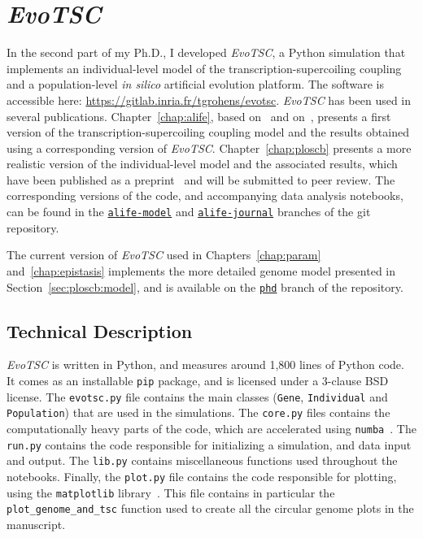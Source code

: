 \section{\emph{EvoTSC}}

In the second part of my Ph.D., I developed \emph{EvoTSC}, a Python simulation that implements an individual-level model of the transcription-supercoiling coupling and a population-level \emph{in silico} artificial evolution platform.
The software is accessible here: \url{https://gitlab.inria.fr/tgrohens/evotsc}.
\emph{EvoTSC} has been used in several publications.
Chapter~\ref{chap:alife}, based on~\cite{grohens2021} and on~\cite{grohens2022a}, presents a first version of the transcription-supercoiling coupling model and the results obtained using a corresponding version of \emph{EvoTSC}.
Chapter~\ref{chap:ploscb} presents a more realistic version of the individual-level model and the associated results, which have been published as a preprint~\citep{grohens2022b} and will be submitted to peer review.
The corresponding versions of the code, and accompanying data analysis notebooks, can be found in the \href{https://gitlab.inria.fr/tgrohens/evotsc/-/tree/alife-model}{\texttt{alife-model}} \citep{grohens2021} and \href{https://gitlab.inria.fr/tgrohens/evotsc/-/tree/alife-journal}{\texttt{alife-journal}} \citep{grohens2022a} branches of the git repository.

The current version of \emph{EvoTSC} used in Chapters~\ref{chap:param} and~\ref{chap:epistasis} implements the more detailed genome model presented in Section~\ref{sec:ploscb:model}, and is available on the \href{https://gitlab.inria.fr/tgrohens/evotsc/-/tree/phd}{\texttt{phd}} branch of the repository.

\subsection{Technical Description}

\emph{EvoTSC} is written in Python, and measures around 1,800 lines of Python code.
It comes as an installable \texttt{pip} package, and is licensed under a 3-clause BSD license.
The \texttt{evotsc.py} file contains the main classes (\texttt{Gene}, \texttt{Individual} and \texttt{Population}) that are used in the simulations.
The \texttt{core.py} files contains the computationally heavy parts of the code, which are accelerated using \texttt{numba}~\citep{lam2015}.
The \texttt{run.py} contains the code responsible for initializing a simulation, and data input and output.
The \texttt{lib.py} contains miscellaneous functions used throughout the notebooks.
Finally, the \texttt{plot.py} file contains the code responsible for plotting, using the \texttt{matplotlib} library~\citep{hunter2007}.
This file contains in particular the \texttt{plot\_genome\_and\_tsc} function used to create all the circular genome plots in the manuscript.

